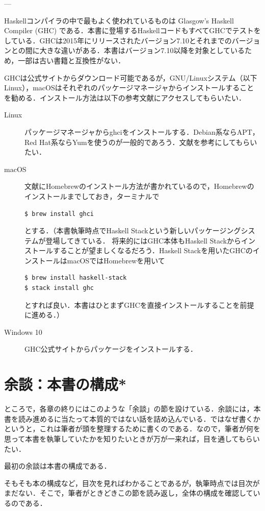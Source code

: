 \documentclass[a4paper,twocolumn]{jsbook}
\newcommand{\programminglanguage}[1]{\textsf{#1}}
\newcommand{\haskell}{\programminglanguage{Haskell}}
\begin{document}
---

\haskell コンパイラの中で最もよく使われているものは Glasgow's Haskell Compiler (GHC) である．本書に登場する\haskell コードもすべてGHCでテストをしている．GHCは2015年にリリースされたバージョン7.10とそれまでのバージョンとの間に大きな違いがある．本書はバージョン7.10以降を対象としているため，一部は古い書籍と互換性がない．

GHCは公式サイト\cite{haskellplatform}からダウンロード可能であるが，GNU/Linuxシステム（以下Linux），macOSはそれぞれのパッケージマネージャからインストールすることを勧める．インストール方法は以下の参考文献にアクセスしてもらいたい．
\begin{description}
\item[Linux] パッケージマネージャからghciをインストールする．Debian系ならAPT，Red Hat系ならYumを使うのが一般的であろう．文献\cite{linux}を参考にしてもらいたい．
\item[macOS] 文献\cite{osx}にHomebrewのインストール方法が書かれているので，Homebrewのインストールまでしておき，ターミナルで
\begin{verbatim}
$ brew install ghci
\end{verbatim} %
とする．（本書執筆時点でHaskell Stackという新しいパッケージングシステムが登場してきている．
将来的にはGHC本体もHaskell Stackからインストールすることが望ましくなるだろう．Haskell Stackを用いたGHCのインストールはmacOSではHomebrewを用いて
\begin{verbatim}
$ brew install haskell-stack
$ stack install ghc
\end{verbatim} %
とすれば良い．本書はひとまずGHCを直接インストールすることを前提に進める．）
\item[Windows 10] GHC公式サイト\cite{haskellplatform}からパッケージをインストールする．
\end{description}


\section{余談：本書の構成*}

ところで，各章の終りにはこのような「余談」の節を設けている．余談には，本書を読み進めるに当たって本質的ではない話を詰め込んでいる．ではなぜ書くかというと，これは筆者が頭を整理するために書くのである．なので，筆者が何を思って本書を執筆していたかを知りたいときが万が一来れば，目を通してもらいたい．

最初の余談は本書の構成である．

そもそも本の構成など，目次を見ればわかることであるが，執筆時点では目次がまだない．そこで，筆者がときどきこの節を読み返し，全体の構成を確認しているのである．
\end{document}
